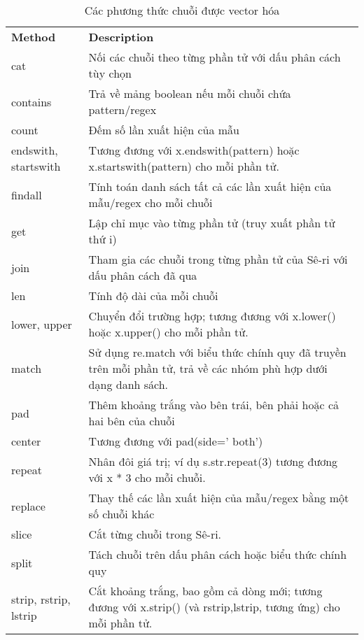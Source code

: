 \begin{table}[h]
\centering
    \begin{tabular}{l|p{10cm}}
      \textbf{ Method}  & \textbf{Description} \\
cat & Nối các chuỗi theo từng phần tử với dấu phân cách tùy chọn \\ 
contains & Trả về mảng boolean nếu mỗi chuỗi chứa pattern/regex \\
count  & Đếm số lần xuất hiện của mẫu  \\
endswith, startswith     &  Tương đương với x.endswith(pattern) hoặc x.startswith(pattern) cho mỗi phần tử.\\
findall   & Tính toán danh sách tất cả các lần xuất hiện của mẫu/regex cho mỗi chuỗi \\
get & Lập chỉ mục vào từng phần tử (truy xuất phần tử thứ i)  \\
join   &  Tham gia các chuỗi trong từng phần tử của Sê-ri với dấu phân cách đã qua \\
len  & Tính độ dài của mỗi chuỗi \\
lower, upper  & Chuyển đổi trường hợp; tương đương với x.lower() hoặc x.upper() cho mỗi phần tử. \\
match   & Sử dụng re.match với biểu thức chính quy đã truyền trên mỗi phần tử, trả về các nhóm phù hợp dưới dạng danh sách. \\
pad  & Thêm khoảng trắng vào bên trái, bên phải hoặc cả hai bên của chuỗi \\
center   & Tương đương với pad(side=' both') \\
repeat   & Nhân đôi giá trị; ví dụ s.str.repeat(3) tương đương với x * 3 cho mỗi chuỗi. \\
replace    & Thay thế các lần xuất hiện của mẫu/regex bằng một số chuỗi khác \\
 slice  &  Cắt từng chuỗi trong Sê-ri.\\
 split &  Tách chuỗi trên dấu phân cách hoặc biểu thức chính quy\\
 strip, rstrip, lstrip  & Cắt khoảng trắng, bao gồm cả dòng mới; tương đương với x.strip() (và rstrip,lstrip, tương ứng) cho mỗi phần tử.
\end{tabular}
    \caption{Các phương thức chuỗi được vector hóa}
    \label{tab:table5e}
\end{table}